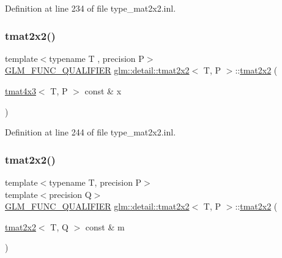 Definition at line 234 of file type\+\_\+mat2x2.\+inl.

\mbox{\label{structglm_1_1detail_1_1tmat2x2_ad9dc3f0b215226f11ba9214e456f69ec}} 
\subsubsection{\texorpdfstring{tmat2x2()}{tmat2x2()}\hspace{0.1cm}{\footnotesize\ttfamily [18/22]}}
{\footnotesize\ttfamily template$<$typename T , precision P$>$ \\
\hyperlink{setup_8hpp_a33fdea6f91c5f834105f7415e2a64407}{G\+L\+M\+\_\+\+F\+U\+N\+C\+\_\+\+Q\+U\+A\+L\+I\+F\+I\+ER} \hyperlink{structglm_1_1detail_1_1tmat2x2}{glm\+::detail\+::tmat2x2}$<$ T, P $>$\+::\hyperlink{structglm_1_1detail_1_1tmat2x2}{tmat2x2} (\begin{DoxyParamCaption}\item[{\hyperlink{structglm_1_1detail_1_1tmat4x3}{tmat4x3}$<$ T, P $>$ const \&}]{x }\end{DoxyParamCaption})\hspace{0.3cm}{\ttfamily [explicit]}}



Definition at line 244 of file type\+\_\+mat2x2.\+inl.

\mbox{\label{structglm_1_1detail_1_1tmat2x2_ae0e7fef5869427ad788ea783dc2c87cc}} 
\subsubsection{\texorpdfstring{tmat2x2()}{tmat2x2()}\hspace{0.1cm}{\footnotesize\ttfamily [19/22]}}
{\footnotesize\ttfamily template$<$typename T, precision P$>$ \\
template$<$precision Q$>$ \\
\hyperlink{setup_8hpp_a33fdea6f91c5f834105f7415e2a64407}{G\+L\+M\+\_\+\+F\+U\+N\+C\+\_\+\+Q\+U\+A\+L\+I\+F\+I\+ER} \hyperlink{structglm_1_1detail_1_1tmat2x2}{glm\+::detail\+::tmat2x2}$<$ T, P $>$\+::\hyperlink{structglm_1_1detail_1_1tmat2x2}{tmat2x2} (\begin{DoxyParamCaption}\item[{\hyperlink{structglm_1_1detail_1_1tmat2x2}{tmat2x2}$<$ T, Q $>$ const \&}]{m }\end{DoxyParamCaption})}



